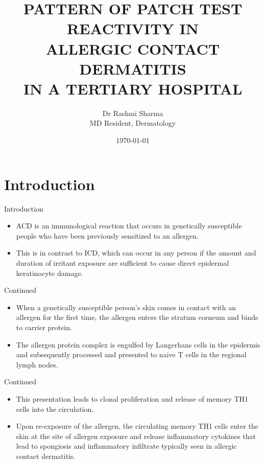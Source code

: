 \documentclass[11pt]{beamer}
\title[Patch test in ACD]{PATTERN OF PATCH TEST REACTIVITY IN \\[5pt]  ALLERGIC CONTACT DERMATITIS \\[5pt] IN A TERTIARY HOSPITAL} %
\author[Dr Rashmi Sharma]{Dr Rashmi Sharma \\ [5pt] MD Resident, Dermatology} %
\institute[TUTH] %
{
	Tribhuvan University Teaching Hospital \\ %
	\medskip
	\textit{rashmee652@gmail.com} %
}
\date{\today} %
\begin{document}
	
	\begin{frame}
	\titlepage 
\end{frame}

\section{Introduction}

\begin{frame}{Introduction}
\begin{itemize}
	\item ACD is an immunological reaction that occurs in genetically susceptible people who have been previously sensitized to an allergen.
	\item This is in contrast to ICD, which can occur in any person if the amount and duration of irritant exposure are sufficient to cause direct epidermal keratinocyte damage.\footnotemark 
\end{itemize}

\end{frame}

\begin{frame}{Continued}
\begin{itemize}
\item When a genetically susceptible person’s skin comes in contact with an allergen for the first time, the allergen enters the stratum corneum and binds to carrier protein.
\item The allergen protein complex is engulfed by Langerhans cells in the epidermis and subsequently processed and presented to naive T cells in the regional lymph nodes.

\end{itemize}
\end{frame}

\begin{frame}{Continued}
\begin{itemize}
\item This presentation leads to clonal proliferation and release of memory TH1 cells into the circulation.
\item Upon re-exposure of the allergen, the circulating memory TH1 cells enter the skin at the site of allergen exposure and release inflammatory cytokines that lead to spongiosis and inflammatory infiltrate typically seen in allergic contact dermatitis.\footnotemark[1]
\end{itemize}
\end{frame}
\end{document}
